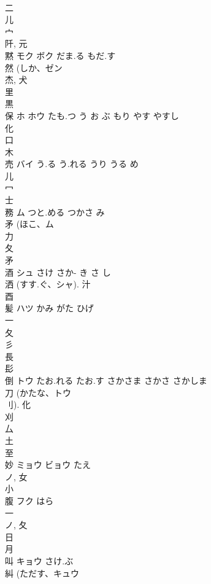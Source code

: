 \documentclass[8pt]{extreport}
\begin{document}
\begin{CJK}{UTF8}{min}
\\	二 
\\	儿 
\\	宀 
\\	阡, 元 
\\	黙	モク ボク	だま.る もだ.す	
\\	然 (しか、ゼン 
\\	杰, 犬 
\\	里 
\\	黒 
\\	保	ホ ホウ	たも.つ う お ぶ もり やす やすし	
\\	化 
\\	口 
\\	木 
\\	売	バイ	う.る う.れる うり うる め	
\\	儿 
\\	冖 
\\	士 
\\	務	ム	つと.める つかさ み	
\\	矛 (ほこ、ム 
\\	力 
\\	夂 
\\	矛 
\\	酒	シュ	さけ さか- き さ し	
\\	洒 (すす.ぐ、シャ).			汁 
\\	酉 
\\	髪	ハツ	かみ がた ひげ	
\\	一 
\\	夂 
\\	彡 
\\	長 
\\	髟 
\\	倒	トウ	たお.れる たお.す さかさま さかさ さかしま	
\\	刀 (かたな、トウ 
\\	刂).			化 
\\	刈 
\\	厶 
\\	土 
\\	至 
\\	妙	ミョウ ビョウ	たえ	
\\	ノ, 女 
\\	小 
\\	腹	フク	はら	
\\	一 
\\	ノ, 夂 
\\	日 
\\	月 
\\	叫	キョウ	さけ.ぶ	
\\	糾 (ただす、キュウ 

\end{CJK}
\end{document}

